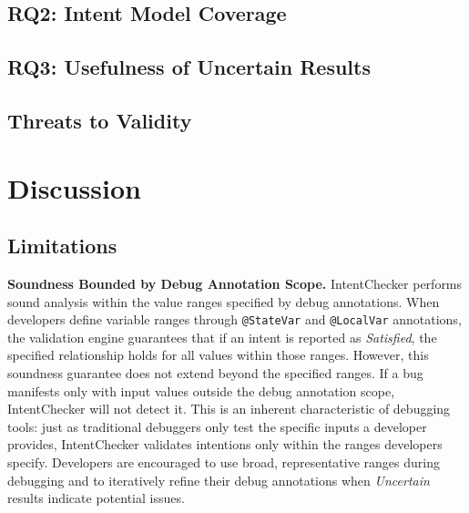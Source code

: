 \documentclass[pdflatex,sn-basic]{sn-jnl}%
\theoremstyle{thmstyleone}%
\theoremstyle{thmstyletwo}%
\theoremstyle{thmstylethree}%
\begin{document}

\subsection{RQ2: Intent Model Coverage}


\subsection{RQ3: Usefulness of Uncertain Results}


\subsection{Threats to Validity}


\section{Discussion}\label{sec:discussion}

\subsection{Limitations}

\noindent\textbf{Soundness Bounded by Debug Annotation Scope.}
IntentChecker performs sound analysis within the value ranges specified by debug annotations.
When developers define variable ranges through \texttt{@StateVar} and \texttt{@LocalVar} annotations,
the validation engine guarantees that if an intent is reported as \textit{Satisfied},
the specified relationship holds for all values within those ranges.
However, this soundness guarantee does not extend beyond the specified ranges.
If a bug manifests only with input values outside the debug annotation scope,
IntentChecker will not detect it.
This is an inherent characteristic of debugging tools:
just as traditional debuggers only test the specific inputs a developer provides,
IntentChecker validates intentions only within the ranges developers specify.
Developers are encouraged to use broad, representative ranges during debugging
and to iteratively refine their debug annotations when \textit{Uncertain} results indicate potential issues.
\end{document}
